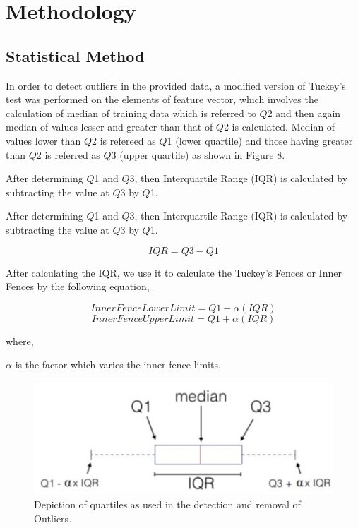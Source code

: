 \documentclass[conference]{IEEEtran}
\begin{document}
\section{Methodology}

\subsection{\label{sec:level1}	Statistical Method}
In order to detect outliers in the provided data, a modified version of Tuckey's test was performed on the elements of feature vector, which involves the calculation of median of training data which is referred to $\mathit{Q}$2 and then again median of values lesser and greater than that of $\mathit{Q}$2  is calculated. Median of values lower than $\mathit{Q}$2  is refereed as $\mathit{Q}$1  (lower quartile) and those having greater than $\mathit{Q}$2 is referred as $\mathit{Q}$3  (upper quartile) as shown in Figure 8. 

After determining $\mathit{Q}$1 and $\mathit{Q}$3, then Interquartile Range (IQR) is calculated by subtracting the value at $\mathit{Q}$3 by $\mathit{Q}$1.


After determining $\mathit{Q}$1 and $\mathit{Q}$3, then Interquartile Range (IQR) is calculated by subtracting the value at $\mathit{Q}$3 by $\mathit{Q}$1.

\begin{equation}
IQR = Q3 - Q1
\end{equation}

After calculating the IQR, we use it to calculate the Tuckey's Fences or Inner Fences by the following equation,

\begin{equation}
InnerFenceLowerLimit = Q1 - \alpha (IQR)
\end{equation}
\begin{equation}
InnerFenceUpperLimit = Q1 + \alpha (IQR)
\end{equation}

where,

$\mathit{\alpha}$ is the factor which varies the inner fence limits.

\begin{figure}[t]
	\includegraphics[width=\linewidth]{IQR.jpg}
	\caption{Depiction of quartiles as used in the detection and removal of
		Outliers.}
	\label{fig:boat0}
\end{figure}
\end{document}
